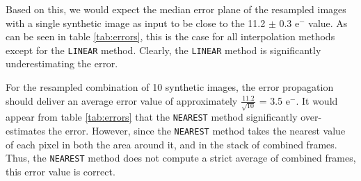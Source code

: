 Based on this, we would expect the median error plane of the resampled images with a single synthetic image as input to
be close to the 11.2 $\pm$ 0.3 e$^-$ value.   As can be seen in table \ref{tab:errors}, this is the case for all interpolation methods
except for the {\tt LINEAR} method.  Clearly, the {\tt LINEAR} method is significantly underestimating the error.

For the resampled combination of 10 synthetic images, the error propagation should deliver an average error value of approximately 
$\frac{11.2}{\sqrt{10}}$ = 3.5 e$^-$.  It would appear from table \ref{tab:errors} that the {\tt NEAREST} method significantly over-estimates the error.
However, since the {\tt NEAREST} method takes the nearest value of each pixel in both the area around it, and in the stack of combined frames.
Thus, the {\tt NEAREST} method does not compute a strict average of combined frames, this error value is correct.

%
%



